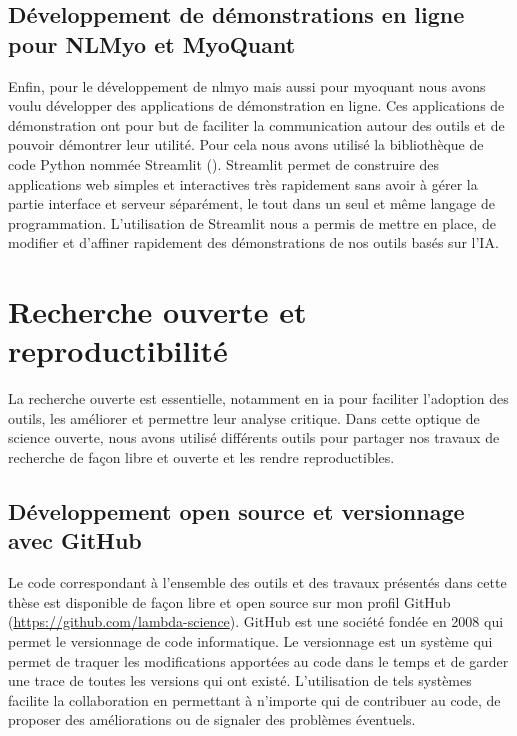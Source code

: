 \subsection{Développement de démonstrations en ligne pour NLMyo et MyoQuant}
Enfin, pour le développement de \gls{nlmyo} mais aussi pour \gls{myoquant} nous avons voulu développer des applications de démonstration en ligne. Ces applications de démonstration ont pour but de faciliter la communication autour des outils et de pouvoir démontrer leur utilité. Pour cela nous avons utilisé la bibliothèque de code Python nommée Streamlit (\cite{adrien_treuille_streamlit_2018}). Streamlit permet de construire des applications web simples et interactives très rapidement sans avoir à gérer la partie interface et serveur séparément, le tout dans un seul et même langage de programmation. L'utilisation de Streamlit nous a permis de mettre en place, de modifier et d'affiner rapidement des démonstrations de nos outils basés sur l'IA.

\section{Recherche ouverte et reproductibilité}
La recherche ouverte est essentielle, notamment en \gls{ia} pour faciliter l'adoption des outils, les améliorer et permettre leur analyse critique. Dans cette optique de science ouverte, nous avons utilisé différents outils pour partager nos travaux de recherche de façon libre et ouverte et les rendre reproductibles.

\subsection{Développement open source et versionnage avec GitHub}
Le code correspondant à l'ensemble des outils et des travaux présentés dans cette thèse est disponible de façon libre et open source sur mon profil GitHub (\url{https://github.com/lambda-science}). GitHub est une société fondée en 2008 qui permet le versionnage de code informatique. Le versionnage est un système qui permet de traquer les modifications apportées au code dans le temps et de garder une trace de toutes les versions qui ont existé. L'utilisation de tels systèmes facilite la collaboration en permettant à n'importe qui de contribuer au code, de proposer des améliorations ou de signaler des problèmes éventuels.

